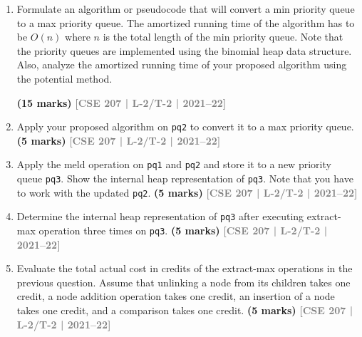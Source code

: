 \documentclass[12pt,a3paper]{article}
\newcommand{\yr}[1]{\hfill\textcolor{gray}{\small\textbf{[#1]}}}
\newcommand{\mk}[1]{\textcolor{orange!70!black}{\small\textbf{(#1 marks)}}}
\begin{document}
\begin{enumerate}
\begin{center}
  \end{center}
\begin{enumerate}
\item Formulate an algorithm or pseudocode that will convert a min priority queue to a max priority queue. The amortized running time of the algorithm has to be $O(n)$ where $n$ is the total length of the min priority queue. Note that the priority queues are implemented using the binomial heap data structure. Also, analyze the amortized running time of your proposed algorithm using the potential method.
 
\mk{15} \yr{CSE 207 | L-2/T-2 | 2021--22}

\item Apply your proposed algorithm on \texttt{pq2} to convert it to a max priority queue.
\mk{5} \yr{CSE 207 | L-2/T-2 | 2021--22}

\item Apply the meld operation on \texttt{pq1} and \texttt{pq2} and store it to a new priority queue \texttt{pq3}. Show the internal heap representation of \texttt{pq3}. Note that you have to work with the updated \texttt{pq2}.
\mk{5} \yr{CSE 207 | L-2/T-2 | 2021--22}

\item Determine the internal heap representation of \texttt{pq3} after executing extract-max operation three times on \texttt{pq3}.
\mk{5} \yr{CSE 207 | L-2/T-2 | 2021--22}

\item Evaluate the total actual cost in credits of the extract-max operations in the previous question. Assume that unlinking a node from its children takes one credit, a node addition operation takes one credit, an insertion of a node takes one credit, and a comparison takes one credit.
\mk{5} \yr{CSE 207 | L-2/T-2 | 2021--22}



\end{enumerate}
\end{enumerate}
\end{document}

